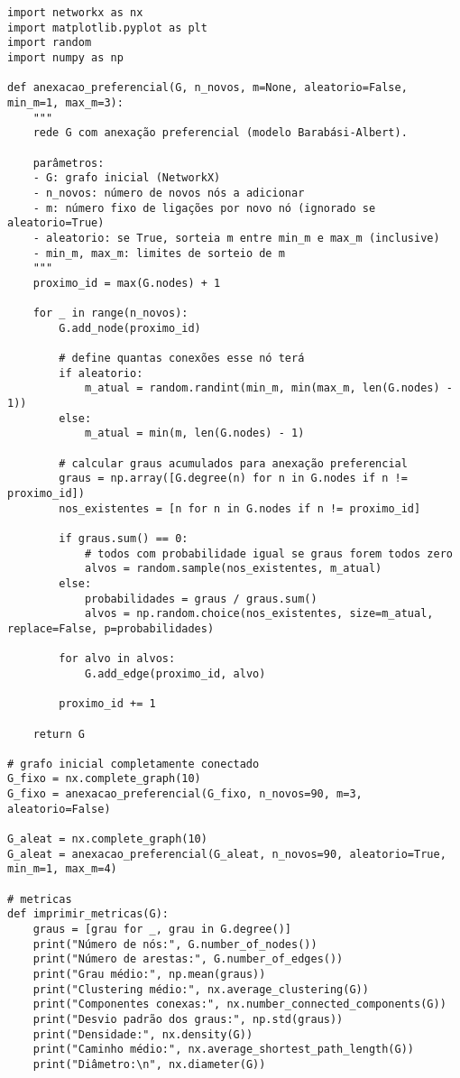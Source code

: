 \documentclass[a4paper]{article}
\begin{document}
\begin{verbatim}
import networkx as nx
import matplotlib.pyplot as plt
import random
import numpy as np

def anexacao_preferencial(G, n_novos, m=None, aleatorio=False, min_m=1, max_m=3):
    """
    rede G com anexação preferencial (modelo Barabási-Albert).

    parâmetros:
    - G: grafo inicial (NetworkX)
    - n_novos: número de novos nós a adicionar
    - m: número fixo de ligações por novo nó (ignorado se aleatorio=True)
    - aleatorio: se True, sorteia m entre min_m e max_m (inclusive)
    - min_m, max_m: limites de sorteio de m
    """
    proximo_id = max(G.nodes) + 1

    for _ in range(n_novos):
        G.add_node(proximo_id)

        # define quantas conexões esse nó terá
        if aleatorio:
            m_atual = random.randint(min_m, min(max_m, len(G.nodes) - 1))
        else:
            m_atual = min(m, len(G.nodes) - 1)

        # calcular graus acumulados para anexação preferencial
        graus = np.array([G.degree(n) for n in G.nodes if n != proximo_id])
        nos_existentes = [n for n in G.nodes if n != proximo_id]

        if graus.sum() == 0:
            # todos com probabilidade igual se graus forem todos zero
            alvos = random.sample(nos_existentes, m_atual)
        else:
            probabilidades = graus / graus.sum()
            alvos = np.random.choice(nos_existentes, size=m_atual, replace=False, p=probabilidades)

        for alvo in alvos:
            G.add_edge(proximo_id, alvo)

        proximo_id += 1

    return G

# grafo inicial completamente conectado
G_fixo = nx.complete_graph(10)
G_fixo = anexacao_preferencial(G_fixo, n_novos=90, m=3, aleatorio=False)

G_aleat = nx.complete_graph(10)
G_aleat = anexacao_preferencial(G_aleat, n_novos=90, aleatorio=True, min_m=1, max_m=4)

# metricas
def imprimir_metricas(G):
    graus = [grau for _, grau in G.degree()]
    print("Número de nós:", G.number_of_nodes())
    print("Número de arestas:", G.number_of_edges())
    print("Grau médio:", np.mean(graus))
    print("Clustering médio:", nx.average_clustering(G))
    print("Componentes conexas:", nx.number_connected_components(G))
    print("Desvio padrão dos graus:", np.std(graus))
    print("Densidade:", nx.density(G))
    print("Caminho médio:", nx.average_shortest_path_length(G))
    print("Diâmetro:\n", nx.diameter(G))



\end{verbatim}
\end{document}
